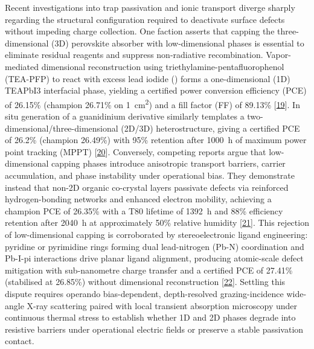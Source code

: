 \documentclass[
  11pt,
]{article}
\begin{document}
Recent investigations into trap passivation and ionic transport diverge
sharply regarding the structural configuration required to deactivate
surface defects without impeding charge collection. One faction asserts
that capping the three-dimensional (3D) perovskite absorber with
low-dimensional phases is essential to eliminate residual reagents and
suppress non-radiative recombination. Vapor-mediated dimensional
reconstruction using triethylamine-pentafluorophenol (TEA-PFP) to react
with excess lead iodide () forms a one-dimensional (1D) TEAPbI3
interfacial phase, yielding a certified power conversion efficiency
(PCE) of 26.15\% (champion 26.71\% on \qty{1}{\centi\meter\squared}) and
a fill factor (FF) of 89.13\%
{[}\href{https://doi.org/10.1038/s41467-026-72790-1}{19}{]}. In situ
generation of a guanidinium derivative similarly templates a
two-dimensional/three-dimensional (2D/3D) heterostructure, giving a
certified PCE of 26.2\% (champion 26.49\%) with 95\% retention after
\qty{1000}{\hour} of maximum power point tracking (MPPT)
{[}\href{https://doi.org/10.1002/anie.8890696}{20}{]}. Conversely,
competing reports argue that low-dimensional capping phases introduce
anisotropic transport barriers, carrier accumulation, and phase
instability under operational bias. They demonstrate instead that non-2D
organic co-crystal layers passivate defects via reinforced
hydrogen-bonding networks and enhanced electron mobility, achieving a
champion PCE of 26.35\% with a T80 lifetime of \qty{1392}{\hour} and
88\% efficiency retention after \qty{2040}{\hour} at approximately 50\%
relative humidity
{[}\href{https://doi.org/10.1002/adma.202519138}{21}{]}. This rejection
of low-dimensional capping is corroborated by stereoelectronic ligand
engineering: pyridine or pyrimidine rings forming dual lead-nitrogen
(Pb-N) coordination and Pb-I-pi interactions drive planar ligand
alignment, producing atomic-scale defect mitigation with sub-nanometre
charge transfer and a certified PCE of 27.41\% (stabilised at 26.85\%)
without dimensional reconstruction
{[}\href{https://doi.org/10.1038/s41586-026-10626-0}{22}{]}. Settling
this dispute requires operando bias-dependent, depth-resolved
grazing-incidence wide-angle X-ray scattering paired with local
transient absorption microscopy under continuous thermal stress to
establish whether 1D and 2D phases degrade into resistive barriers under
operational electric fields or preserve a stable passivation contact.
\end{document}

